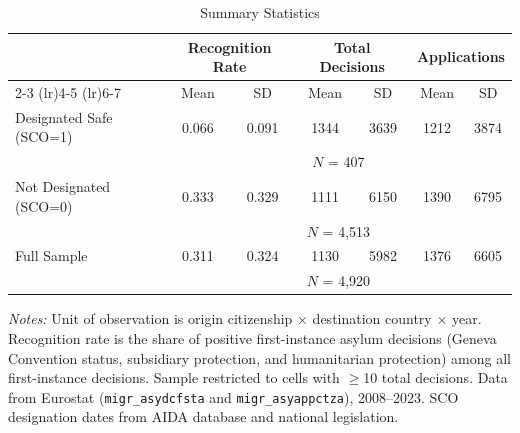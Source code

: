 \begin{table}[H]
\centering
\caption{Summary Statistics}
\begin{threeparttable}
\begin{tabular}{lcccccc}
\toprule
 & \multicolumn{2}{c}{Recognition Rate} & \multicolumn{2}{c}{Total Decisions} & \multicolumn{2}{c}{Applications} \\
\cmidrule(lr){2-3} \cmidrule(lr){4-5} \cmidrule(lr){6-7}
 & Mean & SD & Mean & SD & Mean & SD \\
\midrule
Designated Safe (SCO=1) & 0.066 & 0.091 & 1344 & 3639 & 1212 & 3874 \\
 & \multicolumn{6}{c}{\footnotesize $N$ = 407} \\[0.3em]
Not Designated (SCO=0) & 0.333 & 0.329 & 1111 & 6150 & 1390 & 6795 \\
 & \multicolumn{6}{c}{\footnotesize $N$ = 4,513} \\[0.3em]
\midrule
Full Sample & 0.311 & 0.324 & 1130 & 5982 & 1376 & 6605 \\
 & \multicolumn{6}{c}{\footnotesize $N$ = 4,920} \\
\bottomrule
\end{tabular}
\begin{tablenotes}[flushleft]
\small
\item \textit{Notes:} Unit of observation is origin citizenship $\times$ destination country $\times$ year. Recognition rate is the share of positive first-instance asylum decisions (Geneva Convention status, subsidiary protection, and humanitarian protection) among all first-instance decisions. Sample restricted to cells with $\geq$10 total decisions. Data from Eurostat (\texttt{migr\_asydcfsta} and \texttt{migr\_asyappctza}), 2008--2023. SCO designation dates from AIDA database and national legislation.
\end{tablenotes}
\end{threeparttable}
\label{tab:summary}
\end{table}
